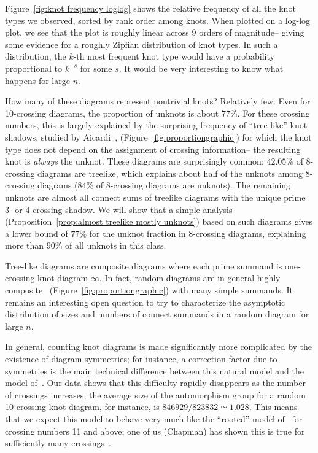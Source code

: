 \documentclass[amsmath,secnumarabic,floatfix,amssymb,nofootinbib,nobibnotes,letterpaper,11pt,tightenlines,showkeys]{revtex4}
\theoremstyle{definition}
\begin{document}
Figure~\ref{fig:knot frequency loglog} shows the relative frequency of all the knot types we observed, sorted by rank order among knots. When plotted on a log-log plot, we see that the plot is roughly linear across 9 orders of magnitude-- giving some evidence for a roughly Zipfian distribution of knot types. In such a distribution, the $k$-th most frequent knot type would have a probability proportional to $k^{-s}$ for some $s$. It would be very interesting to know what happens for large $n$.

How many of these diagrams represent nontrivial knots? Relatively few. Even for 10-crossing diagrams, the proportion of unknots is about $77\%$. For these crossing numbers, this is largely explained by the surprising frequency of ``tree-like'' knot shadows, studied by Aicardi~\cite{Aicardi:1994uq}, (Figure~\ref{fig:proportiongraphic}) for which the knot type does not depend on the assignment of crossing information-- the resulting knot is \emph{always} the unknot. These diagrams are surprisingly common: $42.05\%$ of 8-crossing diagrams are treelike, which explains about half of the unknots among 8-crossing diagrams ($84\%$ of 8-crossing diagrams are unknots). The remaining unknots are almost all connect sums of treelike diagrams with the unique prime 3- or 4-crossing shadow. We will show that a simple analysis (Proposition~\ref{prop:almost treelike mostly unknots}) based on such diagrams gives a lower bound of $77\%$ for the unknot fraction in 8-crossing diagrams, explaining more than $90\%$ of all unknots in this class.

Tree-like diagrams are composite diagrams where each prime summand is one-crossing knot diagram $\infty$. In fact, random diagrams are in general highly composite~\cite{Chapman2015knotasymp} (Figure~\ref{fig:proportiongraphic}) with many simple summands. It remains an interesting open question to try to characterize the asymptotic distribution of sizes and numbers of connect summands in a random diagram for large $n$.

In general, counting knot diagrams is made significantly more complicated by the existence of diagram symmetries; for instance, a correction factor due to symmetries is the main technical difference between this natural model and the model of~\cite{Schaeffer:2004tt}. Our data shows that this difficulty rapidly disappears as the number of crossings increases; the average size of the automorphism group for a random 10 crossing knot diagram, for instance, is $846929/823832 \simeq 1.028$. This means that we expect this model to behave very much like the ``rooted'' model of~\cite{Schaeffer:2004tt} for crossing numbers 11 and above; one of us (Chapman) has shown this is true for sufficiently many crossings~\cite{Chapman2015knotasymp}.
\end{document}
